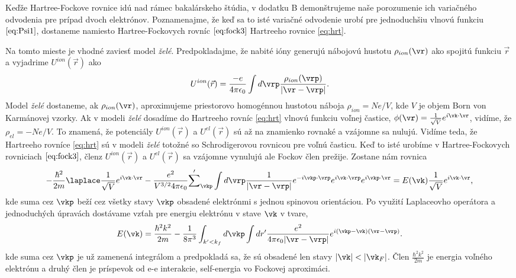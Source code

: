 Keďže Hartree-Fockove rovnice idú nad rámec bakalárskeho štúdia, v dodatku B demonštrujeme naše porozumenie ich variačného odvodenia pre prípad dvoch elektrónov. Poznamenajme, že keď sa to isté
variačné odvodenie urobí pre jednoduchšiu vlnovú funkciu $\eqref{eq:Psi1}$, dostaneme namiesto  Hartree-Fockovych rovníc $\eqref{eq:fock3}$  Hartreeho rovnice \eqref{eq:hrt}.

Na tomto mieste je vhodné zaviesť model \emph{želé}. Predpokladajme, že nabité ióny generujú nábojovú hustotu $\rho_{ion}(\vr)$ ako spojitú funkciu $\vec{r}$ a vyjadrime $U^{ion}(\vec{r})$ ako
\begin{equation}
 \label{eq:ion_pudding}
 U^{ion}(\vec{r}) = \frac{-e}{4\pi \epsilon_0}\int d\vrp \frac{\rho_{ion}(\vrp)}{|\vr-\vrp|} \text{.}
\end{equation}
Model \emph{želé} dostaneme, ak $\rho_{ion}(\vr)$, aproximujeme priestorovo homogénnou hustotou náboja $\rho_{ion}=Ne/V$, kde $V$ je objem Born von Karmánovej vzorky.
Ak v modeli \emph{želé} dosadíme do Hartreeho rovníc \eqref{eq:hrt} vlnovú funkciu voľnej častice, $\phi(\vr)=\frac{1}{\sqrt{V}}e^{i\vk\cdot\vr}$, vidíme, že $\rho_{el}=-Ne/V$.
To znamená, že potenciály $U^{ion}(\vec{r})$ a $U^{el}(\vec{r})$
sú až na znamienko rovnaké a vzájomne sa nulujú. Vidíme teda, že Hartreeho rovníce \eqref{eq:hrt} sú v modeli \emph{želé} totožné so Schrodigerovou rovnicou pre voľnú časticu.
Keď to isté urobíme v Hartree-Fockovych rovniciach $\eqref{eq:fock3}$, členz $U^{ion}(\vec{r})$ a $U^{el}(\vec{r})$ sa vzájomne vynulujú ale Fockov člen prežije. Zostane nám rovnica
\begin{equation}
 \label{eq:fock_final}
 -\frac{\hbar^2}{2m}\laplace \frac{1}{\sqrt V}e^{i\vk\cdot\vr}-\frac{e^2}{V^{3/2}4\pi\epsilon_0}{\sum'}_{\vkp}\int d\vrp \frac{1}{|\vr-\vrp|} e^{-i\vkp \cdot \vrp }e^{i\vk \cdot \vrp}e^{i\vkp \cdot \vr}=E(\vk)\frac{1}{\sqrt V}e^{i\vk \cdot \vr} \text{,}
 \end{equation}
kde suma cez $\vkp$ beží cez všetky stavy $\vkp$ obsadené elektrónmi s jednou spinovou orientáciou.
Po využití Laplaceovho operátora a jednoduchých úpravách dostávame vzťah pre energiu elektrónu v stave $\vk$ v tvare,
\begin{equation}
 \label{eq:fock_plane}
 E(\vk)=\frac{\hbar^2 k^2}{2m}-  \frac{1}{8\pi^3} \int_{k'<k_f} d \vkp\int dr'\frac{e^2}{4\pi\epsilon_0|\vr-\vrp|} e^{i(\vkp-\vk)(\vr-\vrp)} \text{.}
\end{equation}
kde  suma cez $\vkp$  je už zamenená integrálom
a predpokladá sa, že sú obsadené len stavy $|\vk|<|\vk_F|$. Člen $\frac{\hbar^2 k^2}{2m}$ je energia voľného elektrónu a druhý člen je príspevok od e-e interakcie, self-energia vo Fockovej aproximáci.

